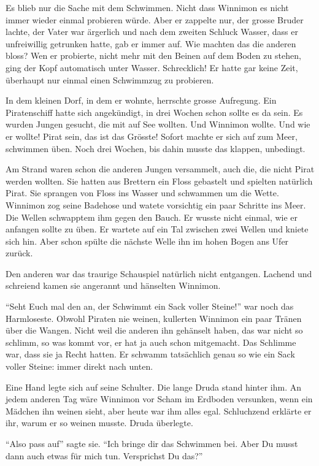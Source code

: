 Es blieb nur die Sache mit dem Schwimmen. Nicht dass Winnimon es nicht immer wieder einmal probieren würde. Aber er zappelte nur, der grosse Bruder lachte, der Vater war ärgerlich und nach dem zweiten Schluck Wasser, dass er unfreiwillig getrunken hatte, gab er immer auf. Wie machten das die anderen bloss? Wen er probierte, nicht mehr mit den Beinen auf dem Boden zu stehen, ging der Kopf automatisch unter Wasser. Schrecklich! Er hatte gar keine Zeit, überhaupt nur einmal einen Schwimmzug zu probieren.

In dem kleinen Dorf, in dem er wohnte, herrschte grosse Aufregung. Ein Piratenschiff hatte sich angekündigt, in drei Wochen schon sollte es da sein. Es wurden Jungen gesucht, die mit auf See wollten. Und Winnimon wollte. Und wie er wollte! Pirat sein, das ist das Grösste! Sofort machte er sich auf zum Meer, schwimmen üben. Noch drei Wochen, bis dahin musste das klappen, unbedingt. 

Am Strand waren schon die anderen Jungen versammelt, auch die, die nicht Pirat werden wollten. Sie hatten aus Brettern ein Floss gebastelt und spielten natürlich Pirat. Sie sprangen von Floss ins Wasser und schwammen um die Wette. Winnimon zog seine Badehose und watete vorsichtig ein paar Schritte ins Meer. Die Wellen schwapptem ihm gegen den Bauch. Er wusste nicht einmal, wie er anfangen sollte zu üben. Er wartete auf ein Tal zwischen zwei Wellen und kniete sich hin. Aber schon spülte die nächste Welle ihn im hohen Bogen ans Ufer zurück. 

Den anderen war das traurige Schauspiel natürlich nicht entgangen. Lachend und schreiend kamen sie angerannt und hänselten Winnimon.

\enquote{Seht Euch mal den an, der Schwimmt ein Sack voller Steine!} war noch das Harmloseste. Obwohl Piraten nie weinen, kullerten Winnimon ein paar Tränen über die Wangen. Nicht weil die anderen ihn gehänselt haben, das war nicht so schlimm, so was kommt vor, er hat ja auch schon mitgemacht. Das Schlimme war, dass sie ja Recht hatten. Er schwamm tatsächlich genau so wie ein Sack voller Steine: immer direkt nach unten.

Eine Hand legte sich auf seine Schulter. Die lange Druda stand hinter ihm. An jedem anderen Tag wäre Winnimon vor Scham im Erdboden versunken, wenn ein Mädchen ihn weinen sieht, aber heute war ihm alles egal. Schluchzend erklärte er ihr, warum er so weinen musste. Druda überlegte. 

\enquote{Also pass auf} sagte sie. \enquote{Ich bringe dir das Schwimmen bei. Aber Du musst dann auch etwas für mich tun. Versprichst Du das?}

